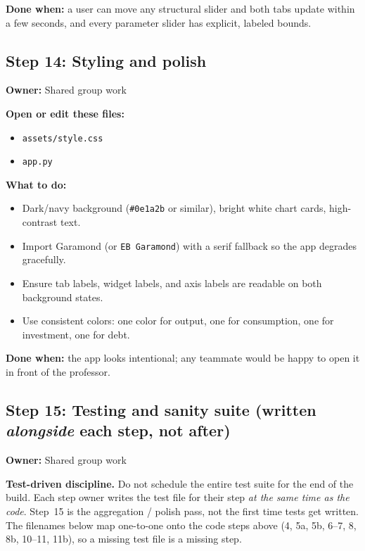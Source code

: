 \documentclass[11pt]{article}
\begin{document}
\textbf{Done when:} a user can move any structural slider and both tabs update within a few seconds, and every parameter slider has explicit, labeled bounds.

\subsection{Step 14: Styling and polish}
\textbf{Owner:} Shared group work

\textbf{Open or edit these files:}
\begin{itemize}
    \item \texttt{assets/style.css}
    \item \texttt{app.py}
\end{itemize}

\textbf{What to do:}
\begin{itemize}
    \item Dark/navy background (\texttt{\#0e1a2b} or similar), bright white chart cards, high-contrast text.
    \item Import Garamond (or \texttt{EB Garamond}) with a serif fallback so the app degrades gracefully.
    \item Ensure tab labels, widget labels, and axis labels are readable on both background states.
    \item Use consistent colors: one color for output, one for consumption, one for investment, one for debt.
\end{itemize}

\textbf{Done when:} the app looks intentional; any teammate would be happy to open it in front of the professor.

\subsection{Step 15: Testing and sanity suite (written \emph{alongside} each step, not after)}
\textbf{Owner:} Shared group work

\begin{warningbox}
\textbf{Test-driven discipline.} Do not schedule the entire test suite for the end of the build. Each step owner writes the test file for their step \emph{at the same time as the code}. Step~15 is the aggregation / polish pass, not the first time tests get written. The filenames below map one-to-one onto the code steps above (4, 5a, 5b, 6--7, 8, 8b, 10--11, 11b), so a missing test file is a missing step.
\end{warningbox}
\end{document}
